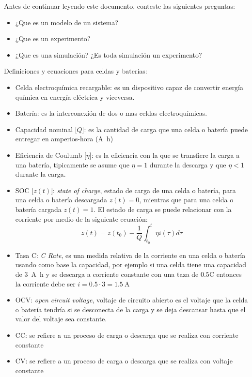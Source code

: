 \documentclass[12pt]{article}
\begin{document}

Antes de continuar leyendo este documento, conteste las siguientes preguntas:
\begin{itemize}
    \item ¿Que es un modelo de un sistema? 
    \item ¿Que es un experimento?   
    \item ¿Que es una simulación? ¿Es toda simulación un experimento?
\end{itemize}

Definiciones y ecuaciones para celdas y baterías:
\begin{itemize}
    \item Celda electroquímica recargable: es un dispositivo capaz de convertir energía química en energía eléctrica y viceversa. 
    \item Batería: es la interconexión de dos o mas celdas electroquímicas.
    \item Capacidad nominal [$Q$]: es la cantidad de carga que una celda o batería puede entregar en amperios-hora (\si{\ampere\hour})
    \item Eficiencia de Coulumb [$\eta$]: es la eficiencia con la que se transfiere la carga a una batería, tipicamente se asume que $\eta = 1$ durante la descarga y que $\eta < 1$ durante la carga. 
    \item SOC [$z(t)$]: \emph{state of charge}, estado de carga de una celda o batería, para una celda o batería descargada $z(t) = 0$, mientras que para una celda o batería cargada $z(t) = 1$. El estado de carga se puede relacionar con la corriente por medio de la siguiente ecuación:
    \begin{equation*}
        z(t) = z(t_0) - \dfrac{1}{Q}\int_{t_0}^t \eta i(\tau) d\tau
    \end{equation*}
    \item Tasa C: \emph{C Rate}, es una medida relativa de la corriente en una celda o batería usando como base la capacidad, por ejemplo si una celda tiene una capacidad de \SI{3}{\ampere\hour} y se descarga a corriente constante con una taza de $0.5$C entonces la corriente debe ser $i=0.5\cdot 3 = \SI{1.5}{\ampere}$
    \item OCV: \emph{open circuit voltage}, voltaje de circuito abierto es el voltaje que la celda o batería tendría si se desconecta de la carga y se deja descansar hasta que el valor del voltaje sea constante. 
    \item CC: se refiere a un proceso de carga o descarga que se realiza con corriente constante
    \item CV: se refiere a un proceso de carga o descarga que se realiza con voltaje constante
\end{itemize}
\end{document}
